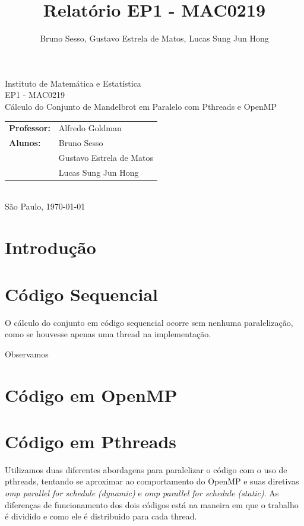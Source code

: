 \documentclass[12pt]{article}
\title{Relatório EP1 - MAC0219}
\author{Bruno Sesso, Gustavo Estrela de Matos, Lucas Sung Jun Hong}
\begin{document}
\doublespacing
\begin{titlepage}
    \vfill
    \begin{center}
        \vspace{0.5\textheight}
        \noindent
        Instituto de Matemática e Estatística \\
        EP1 - MAC0219 \\
        \vfill
        \noindent
        {\Large Cálculo do Conjunto de Mandelbrot
        em Paralelo com Pthreads e OpenMP} \\
        \bigskip
        \bigskip
        \begin{tabular}{ll}
            {\bf Professor:} & {Alfredo Goldman} \\
            {\bf Alunos:}    & {Bruno Sesso} \\
                             & {Gustavo Estrela de Matos} \\
                             & {Lucas Sung Jun Hong} \\
        \end{tabular} \\
        \vspace{\fill}
       \bigskip
        São Paulo, \today \\
       \bigskip
    \end{center}
\end{titlepage}

\pagebreak
\tableofcontents
\pagebreak

\newpage
\section{Introdução}
\newpage

\newpage
\section{Código Sequencial}
O cálculo do conjunto em código sequencial ocorre sem nenhuma paralelização, como se houvesse apenas uma thread na implementação.

Observamos 
\newpage

\newpage
\section{Código em OpenMP}
\newpage

\newpage
\section{Código em Pthreads}
Utilizamos duas diferentes abordagens para paralelizar o código com
o uso de pthreads, tentando se aproximar ao comportamento do OpenMP e 
suas diretivas {\em omp parallel for schedule (dynamic)} e {\em omp 
parallel for schedule (static)}. As diferenças de funcionamento dos 
dois códigos está na maneira em que o trabalho é dividido e como ele é
distribuido para cada thread.
\end{document}
